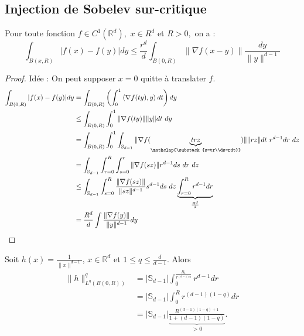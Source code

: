 \subsection{Injection de Sobelev sur-critique}

\begin{proposition}
    Pour toute fonction $f\in C^1(\mathbb{R} ^d),$ $x\in R^d$ et $R>0,$ on a :
    $$\int_{B(x,R)}|f(x)-f(y)| dy\le \frac{r^d}{d}\int_{B(0,R)}\|\nabla f(x-y)\|\frac{dy}{\|y\|^{d-1}}$$
\end{proposition}
\begin{proof}
    Idée : On peut supposer $x=0$ quitte à translater $f.$
    \begin{align*}
        \int_{B(0,R)}|f(x)-f(y)| dy &= \int_{B(0,R)}\left( \int_0^1\left<\nabla f(ty),y \right>dt \right) dy\\
                                    &\le \int_{B(0,R)}\int_0^1\|\nabla f(ty)\|\|y\|dt ~dy\\
                                    &= \int_{B(0,R)}\int_0^1\int_{\mathbb{S}_{d-1}}\|\nabla f(\underbrace{trz}_{\mathclap{\substack{s=tr\\ds=rdt}}})\|\|rz\|dt~r^{d-1}dr~dz\\
                                    &= \int_{\mathbb{S}_{d-1}}\int_{r=0}^{R} \int_{s=0}^{r} \|\nabla f(sz)\|r^{d-1}ds~dr~dz\\
                                    &\le \int_{\mathbb{S}_{d-1}}\int_{s=0}^{R} \frac{\|\nabla f(sz)\|}{\|sz\|^{d-1}}s^{d-1}ds~dz \underbrace{\int_{r=0}^{R} r^{d-1}dr}_{\frac{R^d}{d}}\\
                                    &=\frac{R^d}{d}\int\frac{\|\nabla f(y)\|}{\|y\|^{d-1}}dy
    \end{align*}
\end{proof}
\begin{remarque}
    Soit $h(x)=\frac{1}{\|x\|^{d-1}}$, $x\in \mathbb{R} ^d$ et $1\le q\le \frac{d}{d-1}.$ Alors
    \begin{align*}
        \|h\|^q_{L^q(B(0,R))}&=|\mathbb{S}_{d-1}|\int_0^\frac{R_1}{r^{(d-1)q}}r^{d-1}dr\\
                             &= |\mathbb{S}_{d-1}|\int_0^Rr^{(d-1)(1-q)}dr\\
                             &= |\mathbb{S}_{d-1}|\underbrace{\frac{R^{(d-1)(1-q)+1}}{1+(d-1)(1-q)}}_{>0}.
    \end{align*}
\end{remarque}

